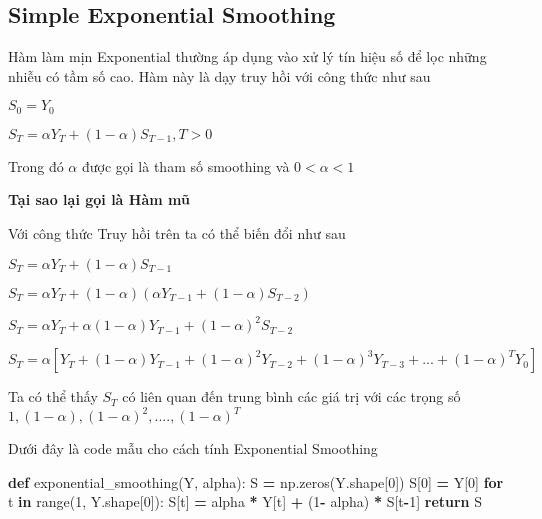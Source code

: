 \documentclass[
]{book}
\newenvironment{Shaded}{\begin{snugshade}}{\end{snugshade}}
\newcommand{\BuiltInTok}[1]{#1}
\newcommand{\ControlFlowTok}[1]{\textcolor[rgb]{0.13,0.29,0.53}{\textbf{#1}}}
\newcommand{\DecValTok}[1]{\textcolor[rgb]{0.00,0.00,0.81}{#1}}
\newcommand{\KeywordTok}[1]{\textcolor[rgb]{0.13,0.29,0.53}{\textbf{#1}}}
\newcommand{\NormalTok}[1]{#1}
\newcommand{\OperatorTok}[1]{\textcolor[rgb]{0.81,0.36,0.00}{\textbf{#1}}}
\begin{document}
\hypertarget{simple-exponential-smoothing}{%
\subsection{Simple Exponential Smoothing}\label{simple-exponential-smoothing}}

Hàm làm mịn Exponential thường áp dụng vào xử lý tín hiệu số để lọc những nhiễu có tầm số cao. Hàm này là dạy truy hồi với công thức như sau

\(S_{0} = Y_{0}\)

\(S_{T} = \alpha Y_{T} + (1 - \alpha)S_{T-1}, T > 0\)

Trong đó \(\alpha\) được gọi là tham số smoothing và \(0 < \alpha < 1\)

\textbf{Tại sao lại gọi là Hàm mũ}

Với công thức Truy hồi trên ta có thể biến đổi như sau

\(S_T = \alpha Y_T + (1 - \alpha)S_{T-1}\)

\(S_T = \alpha Y_T + (1 - \alpha)(\alpha Y_{T-1} + (1 - \alpha)S_{T-2})\)

\(S_T = \alpha Y_T + \alpha(1 - \alpha)Y_{T-1} + (1-\alpha)^2S_{T-2}\)

\(S_T = \alpha[Y_T + (1 - \alpha)Y_{T-1} + (1-\alpha)^2Y_{T-2} + (1-\alpha)^3Y_{T-3} + ... +(1-\alpha)^TY_0]\)

Ta có thể thấy \(S_T\) có liên quan đến trung bình các giá trị với các trọng số
\(1, (1-\alpha), (1-\alpha)^2, ....,(1-\alpha)^T\)

Dưới đây là code mẫu cho cách tính Exponential Smoothing

\begin{Shaded}
\begin{Highlighting}[]
\KeywordTok{def}\NormalTok{ exponential\_smoothing(Y, alpha):}
\NormalTok{    S }\OperatorTok{=}\NormalTok{ np.zeros(Y.shape[}\DecValTok{0}\NormalTok{])}
\NormalTok{    S[}\DecValTok{0}\NormalTok{] }\OperatorTok{=}\NormalTok{ Y[}\DecValTok{0}\NormalTok{]}
    \ControlFlowTok{for}\NormalTok{ t }\KeywordTok{in} \BuiltInTok{range}\NormalTok{(}\DecValTok{1}\NormalTok{, Y.shape[}\DecValTok{0}\NormalTok{]):}
\NormalTok{        S[t] }\OperatorTok{=}\NormalTok{ alpha }\OperatorTok{*}\NormalTok{ Y[t] }\OperatorTok{+}\NormalTok{ (}\DecValTok{1}\OperatorTok{{-}}\NormalTok{ alpha) }\OperatorTok{*}\NormalTok{ S[t}\OperatorTok{{-}}\DecValTok{1}\NormalTok{]}
    \ControlFlowTok{return}\NormalTok{ S}
\end{Highlighting}
\end{Shaded}
\end{document}
